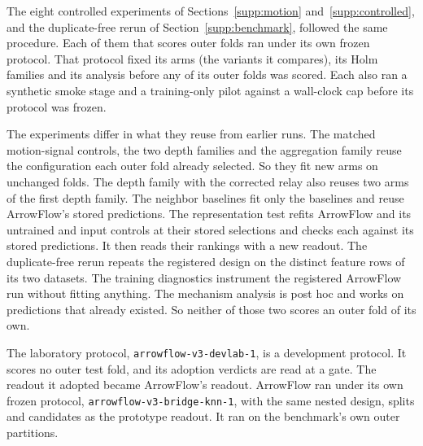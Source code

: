 The eight controlled experiments of Sections~\ref{supp:motion} and~\ref{supp:controlled}, and the duplicate-free rerun of Section~\ref{supp:benchmark}, followed the same procedure. Each of them that scores outer folds ran under its own frozen protocol. That protocol fixed its arms (the variants it compares), its Holm families and its analysis before any of its outer folds was scored. Each also ran a synthetic smoke stage and a training-only pilot against a wall-clock cap before its protocol was frozen.

The experiments differ in what they reuse from earlier runs. The matched motion-signal controls, the two depth families and the aggregation family reuse the configuration each outer fold already selected. So they fit new arms on unchanged folds. The depth family with the corrected relay also reuses two arms of the first depth family. The neighbor baselines fit only the baselines and reuse ArrowFlow's stored predictions. The representation test refits ArrowFlow and its untrained and input controls at their stored selections and checks each against its stored predictions. It then reads their rankings with a new readout. The duplicate-free rerun repeats the registered design on the distinct feature rows of its two datasets. The training diagnostics instrument the registered ArrowFlow run without fitting anything. The mechanism analysis is post hoc and works on predictions that already existed. So neither of those two scores an outer fold of its own.



The laboratory protocol, \texttt{arrowflow-v3-devlab-1}, is a development protocol. It scores no outer test fold, and its adoption verdicts are read at a gate. The readout it adopted became ArrowFlow's readout. ArrowFlow ran under its own frozen protocol, \texttt{arrowflow-v3-bridge-knn-1}, with the same nested design, splits and candidates as the prototype readout. It ran on the benchmark's own outer partitions.

